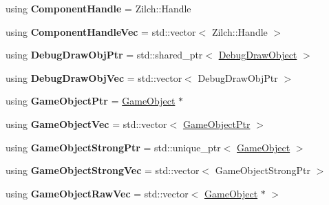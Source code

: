 \begin{DoxyCompactItemize}
\item 
\hypertarget{namespaceDCEngine_a4923810d797e7861321f57140768fbe9}{using {\bfseries Component\-Handle} = Zilch\-::\-Handle}\label{namespaceDCEngine_a4923810d797e7861321f57140768fbe9}

\item 
\hypertarget{namespaceDCEngine_a7275cd7945932366bf1286eb4017c181}{using {\bfseries Component\-Handle\-Vec} = std\-::vector$<$ Zilch\-::\-Handle $>$}\label{namespaceDCEngine_a7275cd7945932366bf1286eb4017c181}

\item 
\hypertarget{namespaceDCEngine_ad57f4d995dae12293b185ab6f5fda420}{using {\bfseries Debug\-Draw\-Obj\-Ptr} = std\-::shared\-\_\-ptr$<$ \hyperlink{classDCEngine_1_1DebugDrawObject}{Debug\-Draw\-Object} $>$}\label{namespaceDCEngine_ad57f4d995dae12293b185ab6f5fda420}

\item 
\hypertarget{namespaceDCEngine_af0b53770d00cac4bbe402ee2195bf46d}{using {\bfseries Debug\-Draw\-Obj\-Vec} = std\-::vector$<$ Debug\-Draw\-Obj\-Ptr $>$}\label{namespaceDCEngine_af0b53770d00cac4bbe402ee2195bf46d}

\item 
\hypertarget{namespaceDCEngine_a0f936955e1167135b01811ecfc08c688}{using {\bfseries Game\-Object\-Ptr} = \hyperlink{classDCEngine_1_1GameObject}{Game\-Object} $\ast$}\label{namespaceDCEngine_a0f936955e1167135b01811ecfc08c688}

\item 
\hypertarget{namespaceDCEngine_a7ace5d7fd290adf80b89e0cb41717fe5}{using {\bfseries Game\-Object\-Vec} = std\-::vector$<$ \hyperlink{classDCEngine_1_1GameObject}{Game\-Object\-Ptr} $>$}\label{namespaceDCEngine_a7ace5d7fd290adf80b89e0cb41717fe5}

\item 
\hypertarget{namespaceDCEngine_a7623f31d10dc869c486230fd48cd3b4c}{using {\bfseries Game\-Object\-Strong\-Ptr} = std\-::unique\-\_\-ptr$<$ \hyperlink{classDCEngine_1_1GameObject}{Game\-Object} $>$}\label{namespaceDCEngine_a7623f31d10dc869c486230fd48cd3b4c}

\item 
\hypertarget{namespaceDCEngine_a3a151a58507d3068a1a826c3d3d70c9d}{using {\bfseries Game\-Object\-Strong\-Vec} = std\-::vector$<$ Game\-Object\-Strong\-Ptr $>$}\label{namespaceDCEngine_a3a151a58507d3068a1a826c3d3d70c9d}

\item 
\hypertarget{namespaceDCEngine_acc1ecd59ba4e13f29e179558683b6c84}{using {\bfseries Game\-Object\-Raw\-Vec} = std\-::vector$<$ \hyperlink{classDCEngine_1_1GameObject}{Game\-Object} $\ast$ $>$}\label{namespaceDCEngine_acc1ecd59ba4e13f29e179558683b6c84}


\end{DoxyCompactItemize}
